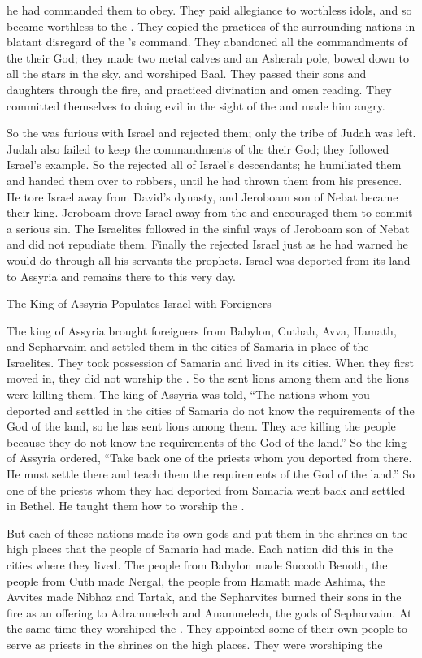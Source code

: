 {he had
commanded them
to obey. They paid
allegiance
to worthless idols,
and so became worthless
to the
{}. They copied the practices
of the surrounding
nations
in blatant disregard
of the
{}’s
command.
They abandoned
all
the commandments
of the {}
their God;
they made
two
metal
calves
and an Asherah pole,
bowed
down to all
the stars
in the sky,
and worshiped
Baal.
They passed
their sons
and daughters
through the fire,
and practiced divination
and omen
reading.
They committed themselves
to doing
evil
in the sight
of the {}
and made him angry.
\par }{\PP {}So the
{}
was furious
with Israel
and rejected
them; only
the tribe
of Judah
was left.
Judah
also
failed to keep
the commandments
of the {}
their God;
they followed
Israel’s
example.
So the
{}
rejected
all
of Israel’s
descendants;
he humiliated
them and handed
them over
to robbers,
until
he had
thrown
them from his presence.
He tore
Israel
away from David’s
dynasty,
and Jeroboam
son
of Nebat
became their king.
Jeroboam
drove
Israel
away
from the
{}
and encouraged
them to commit a serious sin.
The Israelites
followed
in the sinful
ways of Jeroboam
son
of Nebat and did
not
repudiate them.
Finally
the {}
rejected
Israel
just
as he had warned
he would do through
all
his servants
the prophets.
Israel
was deported
from its land
to Assyria
and remains there
to this
very
day.
\par }{\SH The King of Assyria Populates Israel with Foreigners
\par }{\PP {}The king
of Assyria
brought
foreigners from Babylon,
Cuthah,
Avva,
Hamath,
and Sepharvaim
and settled
them in the cities
of Samaria
in place
of the Israelites.
They took possession
of Samaria
and lived
in its cities.
When
they first
moved in,
they did not
worship
the {}. So the
{}
sent
lions among them and the lions
were killing them.
The king
of Assyria
was told, “The nations
whom
you deported
and settled
in the cities
of Samaria
do not
know
the
requirements
of the God
of the land,
so he has sent
lions
among them. They are killing
the
people because
they do not
know
the
requirements
of the God
of the land.”
So
the king
of Assyria
ordered,
“Take back
one
of the priests
whom
you deported
from there.
He
must settle
there
and teach
them the requirements
of the God
of the land.”
So one
of the priests
whom
they had deported
from Samaria
went back
and settled
in Bethel.
He taught
them how
to worship
the {}.
\par }{\PP {}But
each
of these nations
made
its own gods
and put
them in the shrines
on the high places
that
the people of Samaria
had made.
Each
nation
did this in the cities
where
they
lived.
The people
from Babylon
made
Succoth Benoth,
the people
from Cuth
made
Nergal,
the people
from Hamath
made
Ashima,
the Avvites
made
Nibhaz
and Tartak,
and the Sepharvites
burned
their sons
in the fire
as an offering to Adrammelech
and Anammelech,
the gods
of Sepharvaim.
At the
same time they worshiped
the
{}. They
appointed
some of their own people to serve as priests
in the shrines
on the high places.
They were worshiping
the

}
